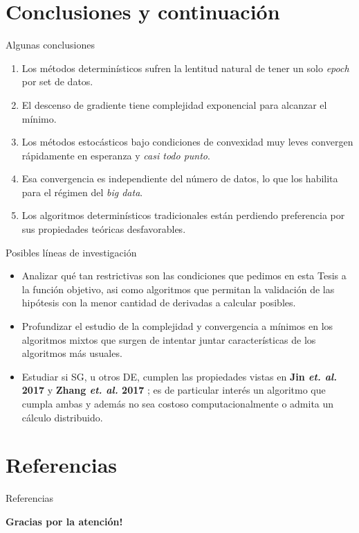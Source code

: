 \documentclass{beamer}
\begin{document}
\section{Conclusiones y continuaci\'on}

\begin{frame}{Algunas conclusiones}
\begin{enumerate}
	\item Los m\'etodos determin\'isticos sufren la lentitud natural de tener un solo \textit{epoch} por set de datos.
	\item El descenso de gradiente tiene complejidad exponencial para alcanzar el m\'inimo.
	\item Los m\'etodos estoc\'asticos bajo condiciones de convexidad muy leves convergen r\'apidamente en esperanza y \textit{casi todo punto}.
	\item Esa convergencia es independiente del n\'umero de datos, lo que los habilita para el r\'egimen del \textit{big data}.
	\item Los algoritmos determin\'isticos tradicionales est\'an perdiendo preferencia por sus propiedades te\'oricas desfavorables.
\end{enumerate}
\end{frame}

\begin{frame}{Posibles l\'ineas de investigaci\'on}

\nocite{jin:2017}\nocite{zhang:2017}

\begin{itemize}
	\item Analizar qu\'e tan restrictivas son las condiciones que pedimos en esta Tesis a la funci\'on objetivo, asi como algoritmos que permitan la validaci\'on de las hip\'otesis con la menor cantidad de derivadas a calcular posibles.
	\item Profundizar el estudio de la complejidad y convergencia a m\'inimos en los algoritmos mixtos que surgen de intentar juntar caracter\'isticas de los algoritmos m\'as usuales.
	\item Estudiar si SG, u otros DE, cumplen las propiedades vistas en \textbf{Jin \textit{et. al.} 2017} y \textbf{Zhang \textit{et. al.} 2017} ; es de particular inter\'es un algoritmo que cumpla ambas y adem\'as no sea costoso computacionalmente o admita un c\'alculo distribuido.
\end{itemize}
\end{frame}

\section{Referencias}
\begin{frame}[allowframebreaks]{Referencias}
\printbibliography

\end{frame}

\begin{frame}
 \begin{center}
  \LARGE{{\bf Gracias por la atenci\'on!}}
 \end{center}
\end{frame}
\end{document}
